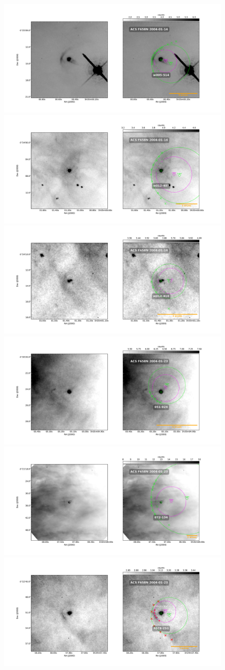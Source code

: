 \documentclass{article}
\begin{document}
\begin{figure}
  \centering
   \includegraphics[width=0.5\linewidth]{j8oc01010_wcs/w005-514-Bally_01-images.pdf}
   \includegraphics[width=0.5\linewidth]{j8oc01010_wcs/w012-407-Bally_01-images.pdf}
   \includegraphics[width=0.5\linewidth]{j8oc01010_wcs/w014-414-Bally_01-images.pdf}
   \includegraphics[width=0.5\linewidth]{j8oc09010_wcs/051-024-Bally_09-images.pdf}
    \includegraphics[width=0.5\linewidth]{j8oc09010_wcs/072-134-Bally_09-images.pdf}
    \includegraphics[width=0.5\linewidth]{j8oc09010_wcs/4578-251-Bally_09-images.pdf}
  \label{fig:images}
\end{figure}
\end{document}

